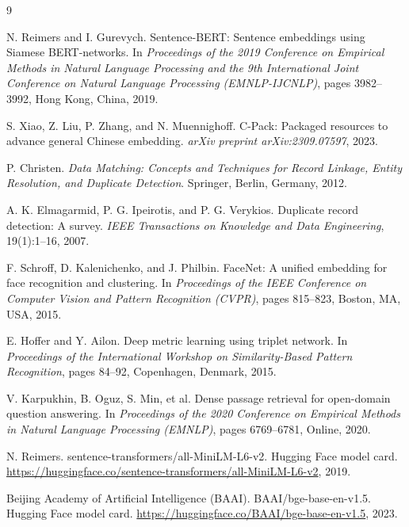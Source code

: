 \documentclass{article}
\begin{document}

\begin{thebibliography}{9}

N. Reimers and I. Gurevych.
\newblock Sentence-BERT: Sentence embeddings using Siamese BERT-networks.
\newblock In \emph{Proceedings of the 2019 Conference on Empirical Methods in Natural Language Processing and the 9th International Joint Conference on Natural Language Processing (EMNLP-IJCNLP)}, pages 3982--3992, Hong Kong, China, 2019.

S. Xiao, Z. Liu, P. Zhang, and N. Muennighoff.
\newblock C-Pack: Packaged resources to advance general Chinese embedding.
\newblock \emph{arXiv preprint arXiv:2309.07597}, 2023.

P. Christen.
\newblock \emph{Data Matching: Concepts and Techniques for Record Linkage, Entity Resolution, and Duplicate Detection}.
\newblock Springer, Berlin, Germany, 2012.

A. K. Elmagarmid, P. G. Ipeirotis, and P. G. Verykios.
\newblock Duplicate record detection: A survey.
\newblock \emph{IEEE Transactions on Knowledge and Data Engineering}, 19(1):1--16, 2007.

F. Schroff, D. Kalenichenko, and J. Philbin.
\newblock FaceNet: A unified embedding for face recognition and clustering.
\newblock In \emph{Proceedings of the IEEE Conference on Computer Vision and Pattern Recognition (CVPR)}, pages 815--823, Boston, MA, USA, 2015.

E. Hoffer and Y. Ailon.
\newblock Deep metric learning using triplet network.
\newblock In \emph{Proceedings of the International Workshop on Similarity-Based Pattern Recognition}, pages 84--92, Copenhagen, Denmark, 2015.

V. Karpukhin, B. Oguz, S. Min, et al.
\newblock Dense passage retrieval for open-domain question answering.
\newblock In \emph{Proceedings of the 2020 Conference on Empirical Methods in Natural Language Processing (EMNLP)}, pages 6769--6781, Online, 2020.

N. Reimers.
\newblock sentence-transformers/all-MiniLM-L6-v2.
\newblock Hugging Face model card.
\url{https://huggingface.co/sentence-transformers/all-MiniLM-L6-v2}, 2019.

Beijing Academy of Artificial Intelligence (BAAI).
\newblock BAAI/bge-base-en-v1.5.
\newblock Hugging Face model card.
\url{https://huggingface.co/BAAI/bge-base-en-v1.5}, 2023.

\end{thebibliography}
\end{document}
